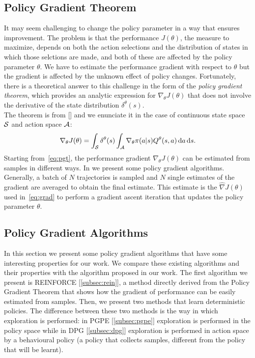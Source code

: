\subsection{Policy Gradient Theorem} \label{subsec:pgt}
It may seem challenging to change the policy parameter in a way that ensures improvement. The problem is that the performance $J(\theta)$, \ie the measure to maximize, depends on both the action selections and the distribution of states in which those selctions are made, and both of these are affected by the policy parameter $\theta$. We have to estimate the performance gradient with respect to $\theta$ but the gradient is affected by the unknown effect of policy changes. Fortunately, there is a theoretical answer to this challenge in the form of the \emph{policy gradient theorem}, which provides an analytic expression for $\nabla_{\theta}J(\theta)$ that does not involve the derivative of the state distribution $\delta^{\theta}(s)$.\\
\newline
The theorem is from [\citet{Sutton1999PolicyGM}] and we enunciate it in the case of continuous state space $\mathcal{S}$ and action space $\mathcal{A}$:
\begin{align} 
\nabla_{\theta}J(\theta) = \int_{\mathcal{S}} \delta^{\theta}(s) \int_{\mathcal{A}} \nabla_{\theta} \pi(a|s) Q^{\theta}(s,a) \,\mathrm{d} a \,\mathrm{d} s. \label{eq:pgt}
\end{align}
Starting from~\eqref{eq:pgt}, the performance gradient $\nabla_{\theta}J(\theta)$ can be estimated from samples in different ways. In  we present some policy gradient algorithms. Generally, a batch of $N$ trajectories is sampled and $N$ single estimates of the gradient are averaged to obtain the final estimate. This estimate is the $\widehat{\nabla }J(\theta)$ used in~\eqref{eq:grad} to perform a gradient ascent iteration that updates the policy parameter $\theta$.

\subsection{Policy Gradient Algorithms} \label{subsec:alg}
In this section we present some policy gradient algorithms that have some interesting properties for our work. We compare these existing algorithms and their properties with the algorithm proposed in our work. The first algorithm we present is REINFORCE [\ref{subsec:rein}], a method directly derived from the Policy Gradient Theorem that shows how the gradient of performance can be easily estimated from samples. Then, we present two methods that learn deterministic policies. The difference between these two methods is the way in which exploration is performed: in \acf{PGPE} [\ref{subsec:pgpe}] exploration is performed in the policy space while in \acf{DPG} [\ref{subsec:dpg}] exploration is performed in action space by a behavioural policy (\ie a policy that collects samples, different from the policy that will be learnt).

